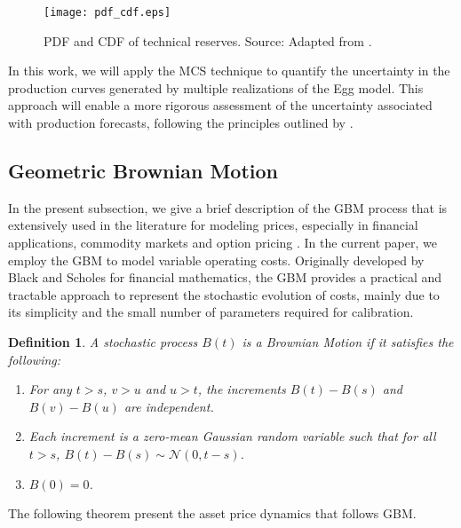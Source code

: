 \documentclass[pdflatex,sn-basic]{sn-jnl}%
\theoremstyle{thmstyleone}%
\theoremstyle{thmstyletwo}%
\theoremstyle{thmstylethree}%
\newtheorem{definition}{Definition}%
\begin{document}
\begin{figure}[H]
\centering
\begin{minipage}{0.85\textwidth}
  \texttt{[image: pdf\_cdf.eps]}
  \caption{PDF and CDF of technical reserves. Source: Adapted from \cite{ref24}.}
  \label{fig7}
\end{minipage}
\end{figure}

In this work, we will apply the MCS technique to quantify the uncertainty in the production curves generated by multiple realizations of the Egg model. This approach will enable a more rigorous assessment of the uncertainty associated with production forecasts, following the principles outlined by \cite{ref24}. 

\subsection{Geometric Brownian Motion}\label{subsec43}

In the present subsection, we give a brief description of the GBM process that is extensively used in the literature for modeling prices, especially in financial applications, commodity markets and option pricing \citep{ref25}. In the current paper, we employ the GBM to model variable operating costs. Originally developed by Black and Scholes for financial mathematics, the GBM provides a practical and tractable approach to represent the stochastic evolution of costs, mainly due to its simplicity and the small number of parameters required for calibration. 

\begin{definition}
A stochastic process $B(t)$ is a Brownian Motion if it satisfies the following:
\begin{enumerate}[label=(\roman*)]
    \item For any $t > s$, $v > u$ and $u > t$, the increments $B(t) - B(s)$ and $B(v) - B(u)$ are independent.
    \item Each increment is a zero-mean Gaussian random variable such that for all $t > s$, $B(t) - B(s) \sim \mathcal{N}(0, t-s)$.
    \item $B(0) = 0$.
\end{enumerate}
\end{definition}

The following theorem present the asset price dynamics that follows GBM.
\end{document}
